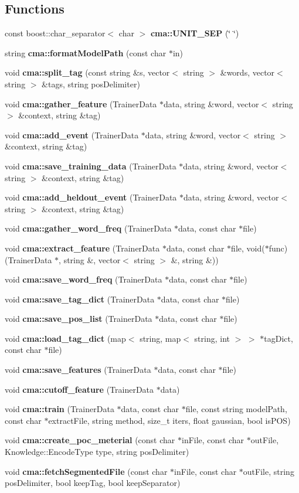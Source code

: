 \subsection*{Functions}
\begin{CompactItemize}
\item 
const boost::char\_\-separator$<$ char $>$ \textbf{cma::UNIT\_\-SEP} (\char`\"{} \char`\"{})\label{namespacecma_f0620dd94c72d29cdfd5879862a0fa3c}

\item 
string {\bf cma::formatModelPath} (const char $\ast$in)
\item 
void {\bf cma::split\_\-tag} (const string \&s, vector$<$ string $>$ \&words, vector$<$ string $>$ \&tags, string posDelimiter)
\item 
void {\bf cma::gather\_\-feature} (TrainerData $\ast$data, string \&word, vector$<$ string $>$ \&context, string \&tag)
\item 
void {\bf cma::add\_\-event} (TrainerData $\ast$data, string \&word, vector$<$ string $>$ \&context, string \&tag)
\item 
void {\bf cma::save\_\-training\_\-data} (TrainerData $\ast$data, string \&word, vector$<$ string $>$ \&context, string \&tag)
\item 
void {\bf cma::add\_\-heldout\_\-event} (TrainerData $\ast$data, string \&word, vector$<$ string $>$ \&context, string \&tag)
\item 
void {\bf cma::gather\_\-word\_\-freq} (TrainerData $\ast$data, const char $\ast$file)
\item 
void {\bf cma::extract\_\-feature} (TrainerData $\ast$data, const char $\ast$file, void($\ast$func)(TrainerData $\ast$, string \&, vector$<$ string $>$ \&, string \&))
\item 
void {\bf cma::save\_\-word\_\-freq} (TrainerData $\ast$data, const char $\ast$file)
\item 
void {\bf cma::save\_\-tag\_\-dict} (TrainerData $\ast$data, const char $\ast$file)
\item 
void \textbf{cma::save\_\-pos\_\-list} (TrainerData $\ast$data, const char $\ast$file)\label{namespacecma_3f1398255ff5b9455a32b5c26b37c73d}

\item 
void {\bf cma::load\_\-tag\_\-dict} (map$<$ string, map$<$ string, int $>$ $>$ $\ast$tagDict, const char $\ast$file)
\item 
void {\bf cma::save\_\-features} (TrainerData $\ast$data, const char $\ast$file)
\item 
void {\bf cma::cutoff\_\-feature} (TrainerData $\ast$data)
\item 
void {\bf cma::train} (TrainerData $\ast$data, const char $\ast$file, const string modelPath, const char $\ast$extractFile, string method, size\_\-t iters, float gaussian, bool isPOS)
\item 
void {\bf cma::create\_\-poc\_\-meterial} (const char $\ast$inFile, const char $\ast$outFile, Knowledge::EncodeType type, string posDelimiter)
\item 
void {\bf cma::fetchSegmentedFile} (const char $\ast$inFile, const char $\ast$outFile, string posDelimiter, bool keepTag, bool keepSeparator)
\end{CompactItemize}



